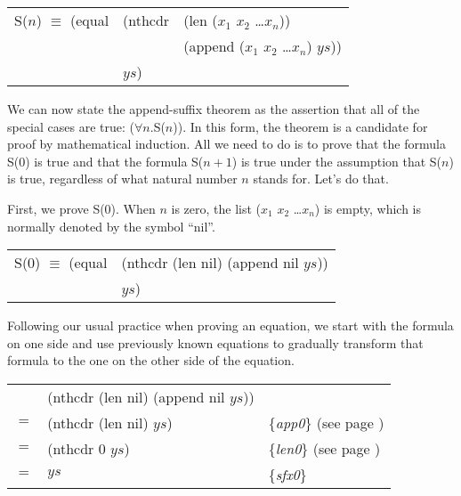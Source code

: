 \begin{center}
\begin{tabular}{lll}
S($n$) $\equiv$ (equal & (nthcdr & (len ($x_1$ $x_2$ \dots $x_n$))          \\
                       &         & (append ($x_1$ $x_2$ \dots $x_n$) $ys$)) \\
                       & $ys$)   &                                          \\
\end{tabular}
\end{center}

We can now state the append-suffix theorem as the assertion that all of the special cases are true: ($\forall$$n$.S($n$)). In this form, the theorem is a candidate for proof by mathematical induction. All we need to do is to prove that the formula S(0) is true and that the formula S($n+1$) is true under the assumption that S($n$) is true, regardless of what natural number $n$ stands for. Let's do that.

First, we prove S(0). When $n$ is zero, the list ($x_1$ $x_2$ \dots $x_n$) is empty, which is normally denoted by the symbol ``nil''.

\begin{center}
\begin{tabular}{ll}
S(0) $\equiv$ (equal & (nthcdr (len nil) (append nil $ys$)) \\
                     & $ys$)                                \\
\end{tabular}
\end{center}

Following our usual practice when proving an equation, we start with the formula on one side and use previously known equations to gradually transform that formula to the one on the other side of the equation.

\begin{center}
\begin{tabular}{lll}
    & (nthcdr (len nil) (append nil $ys$))  &                                                      \\
$=$ & (nthcdr (len nil) $ys$)               & \{\emph{app0}\} (see page \pageref{append-equations})\\
$=$ & (nthcdr 0 $ys$)                       & \{\emph{len0}\} (see page \pageref{len-equations})   \\
$=$ & $ys$                                  & \{\emph{sfx0}\}                                      \\
\end{tabular}
\end{center}

